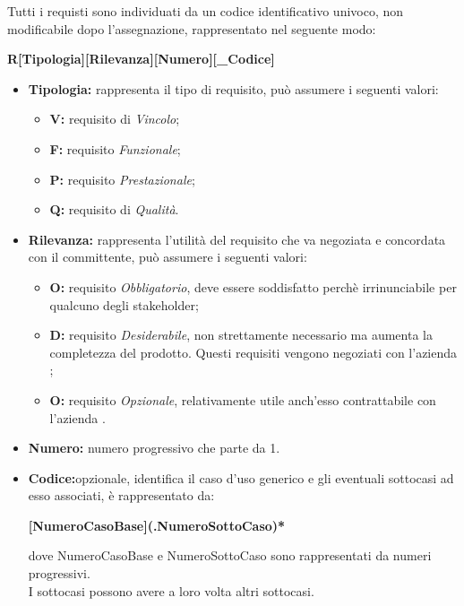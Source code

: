 \label{ClassificazioneRequisiti}
Tutti i requisti sono individuati da un codice identificativo univoco, non modificabile dopo l'assegnazione, rappresentato nel seguente modo:

\begin{center}
	\textbf{R[Tipologia][Rilevanza][Numero][\_Codice]}
\end{center}

\begin{itemize}
	\item \textbf{Tipologia:} rappresenta il tipo di requisito, può assumere i seguenti valori:
	\begin{itemize}
		\item \textbf{V:} requisito di \textit{Vincolo};
		\item \textbf{F:} requisito \textit{Funzionale};
		\item \textbf{P:} requisito \textit{Prestazionale};
		\item \textbf{Q:} requisito di \textit{Qualità}.
	\end{itemize}

	\item \textbf{Rilevanza:} rappresenta l'utilità del requisito che va negoziata e concordata con il committente, può assumere i seguenti valori:
	\begin{itemize}
		\item \textbf{O:} requisito \textit{Obbligatorio}, deve essere soddisfatto perchè irrinunciabile per qualcuno degli stakeholder;
		\item \textbf{D:} requisito \textit{Desiderabile}, non strettamente necessario ma aumenta la completezza del prodotto. Questi requisiti vengono negoziati con l'azienda \Proponente;
		\item \textbf{O:} requisito \textit{Opzionale}, relativamente utile anch'esso contrattabile con l'azienda \Proponente.
	\end{itemize}

	\item \textbf{Numero:} numero progressivo che parte da 1.
	
	\item \textbf{Codice:}opzionale, identifica il caso d'uso generico e gli eventuali sottocasi ad esso associati, è rappresentato da:
	\begin{center}
		\textbf{[NumeroCasoBase](.NumeroSottoCaso)*}
	\end{center}
	dove NumeroCasoBase e NumeroSottoCaso sono rappresentati da numeri progressivi. \\
	I sottocasi possono avere a loro volta altri sottocasi.	
\end{itemize}

